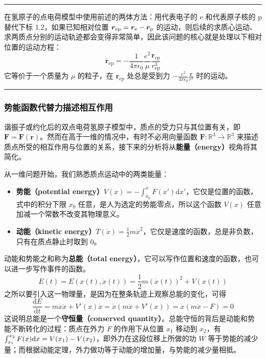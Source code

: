 \documentclass[cn,10pt,math=newtx,citestyle=gb7714-2015,bibstyle=gb7714-2015]{elegantbook}
\def\bm{\boldsymbol}
\def\d{\mathrm d}
\def\R{\mathbb R}
\def\ra{\rightarrow}
\def\srule{\noindent\rule{\linewidth}{0.3mm}}
\begin{document}
\srule

\begin{instance}[氢原子的约化]\label{ins:H_atm_rdc}
在氢原子的点电荷模型中使用前述的两体方法：用代表电子的 e 和代表原子核的 p 替代下标 1,2，如果已知相对位置 $\bm r_\text{ep}=\bm r_\text e-\bm r_\text p$ 的运动，则后续的求质心运动、求两质点分别的运动轨迹都会变得非常简单，因此该问题的核心就是处理以下相对位置的运动方程：
\begin{equation*}
    \ddot{\bm r}_\text{ep} = -\frac{1}{4\pi\epsilon_0}\frac{e^2}{\mu}\frac{\bm r_\text{ep}}{r_\text{ep}^3}
\end{equation*}
它等价于一个质量为 $\mu$ 的粒子，在 $\bm r_\text{ep}$ 处总是受到力 $-\frac{e^2}{4\pi\epsilon_0}\frac{\bm r}{r^3}$ 时的运动。
\end{instance}

\srule

\subsubsection{势能函数代替力描述相互作用}
谐振子或约化后的双点电荷氢原子模型中，质点的受力只与其位置有关，即 $\bm F=\bm F(\bm r)$。然而在高于一维的情况中，有时不必用向量函数 $\bm F:\R^3\ra\R^3$ 来描述质点所受的相互作用与位置的关系，接下来的分析将从\textbf{能量（energy）}视角将其简化。

从一维问题开始，我们熟悉质点运动中的两类能量：
\begin{itemize}
    \item \textbf{势能（potential energy）}$V(x) = -\int^x_{x_0} F(x')\d x'$，它仅是位置的函数，式中的积分下限 $x_0$ 任意，是人为选定的势能零点，所以这个函数 $V(x)$ 任意加减一个常数不改变其物理意义。
    \item \textbf{动能（kinetic energy）}$T(\dot{x})=\frac{1}{2}m \dot{x}^2$，它仅是速度的函数，总是非负数，只有在质点静止时取到 0。
\end{itemize}
动能和势能之和称为\textbf{总能（total energy）}，它可以写作位置和速度的函数，也可以进一步写作事件的函数。
\begin{equation*}
    E(t) = E(x(t),\dot x(t))=\frac{1}{2}m(\dot x(t))^2+V(x(t))
\end{equation*}
之所以要引入这一物理量，是因为在整条轨迹上观察总能的变化，可得
\begin{equation*}
    \frac{\d E}{\d t}=m\dot x\ddot x+V'(x)\dot x=\dot x(m\ddot x+V'(x))=\dot x(m\ddot x-F)=0
\end{equation*}
这说明总能是一个\textbf{守恒量（conserved quantity）}。总能守恒的背后是动能和势能不断转化的过程：质点在外力 $F$ 的作用下从位置 $x_1$ 移动到 $x_2$，有 $\int_{x_1}^{x_2}F(x)\text dx=V(x_1)-V(x_2)$，即外力在这段位移上所做的功 $W$ 等于势能的减少量；而根据动能定理，外力做功等于动能的增加量，与势能的减少量相抵。
\end{document}
